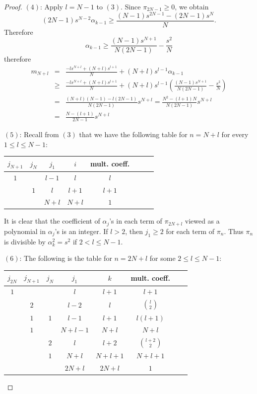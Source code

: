 \documentclass[10pt,a4paper]{amsart}
\begin{document}
\begin{proof}
$(4)$: Apply $l=N-1$ to $(3)$. Since $\pi_{2N-1}\geq0$, we obtain
$$(2N-1)s^{N-2}\alpha_{k-1}\geq\frac{(N-1)s^{2N-1}-(2N-1)s^N}{N}.$$
Therefore
$$\alpha_{k-1}\geq \frac{(N-1)s^{N+1}}{N(2N-1)}-\frac{s^2}{N}$$
therefore
\begin{eqnarray*}
m_{N+l}&=&\frac{-ls^{N+l}+(N+l)s^{l+1}}{N}+(N+l)s^{l-1}\alpha_{k-1}\\
&\geq& \frac{-ls^{N+l}+(N+l)s^{l+1}}{N}+(N+l)s^{l-1}\left(\frac{(N-1)s^{N+1}}{N(2N-1)}-\frac{s^2}{N}\right)\\
&=&\frac{(N+l)(N-1)-l(2N-1)}{N(2N-1)}s^{N+l}=\frac{N^2-(l+1)N}{N(2N-1)}s^{N+l}\\
&=&\frac{N-(l+1)}{2N-1}s^{N+l}
\end{eqnarray*}

$(5)$: Recall from $(3)$ that we have the following table for $n=N+l$ for every $1\leq l\leq N-1$:
\begin{center}
\begin{tabular}{ |c|c|c|c|c|c|c|c| }
\hline
  $j_{N+1}$ & $j_{N}$ & $j_1$ & $i$ & mult. coeff.\\
\hline
 $1$ & & $l-1$ & $l$ & $l$\\ 
\hline
    & $1$  & $l$ & $l+1$ & $l+1$\\ 
\hline
   &  & $N+l$ & $N+l$ & $1$\\ 
\hline
\end{tabular}
\end{center}  

It is clear that the coefficient of $\alpha_j$'s in each term of $\pi_{2N+l}$ viewed as a polynomial in $\alpha_j$'s is an integer. If $l>2$, then $j_1\geq2$ for each term of $\pi_n$. Thus $\pi_n$ is divisible by $\alpha_k^2=s^2$ if $2<l\leq N-1$.

$(6)$: The following is the table for $n=2N+l$ for some $2\leq l\leq N-1$:
\begin{center}
\begin{tabular}{ |c|c|c|c|c|c|c|c| }
\hline
 $j_{2N}$ & $j_{N+1}$ & $j_{N}$ & $j_1$ & $k$ & mult. coeff.\\
\hline
$1$ & & & $l$ & $l+1$ & $l+1$\\ 
\hline
 & $2$ & & $l-2$ & $l$ & $\binom{l}{2}$\\ 
\hline
  & $1$ & $1$ & $l-1$ & $l+1$ & $l(l+1)$\\ 
\hline
  & $1$ & & $N+l-1$ & $N+l$ & $N+l$\\ 
\hline
  & & $2$ &  $l$ & $l+2$ & $\binom{l+2}{2}$\\ 
\hline
  & & $1$ & $N+l$ & $N+l+1$ & $N+l+1$\\ 
\hline
  & &  & $2N+l$ & $2N+l$ & $1$\\ 
\hline
\end{tabular}
\end{center}  


\end{proof}
\end{document}
